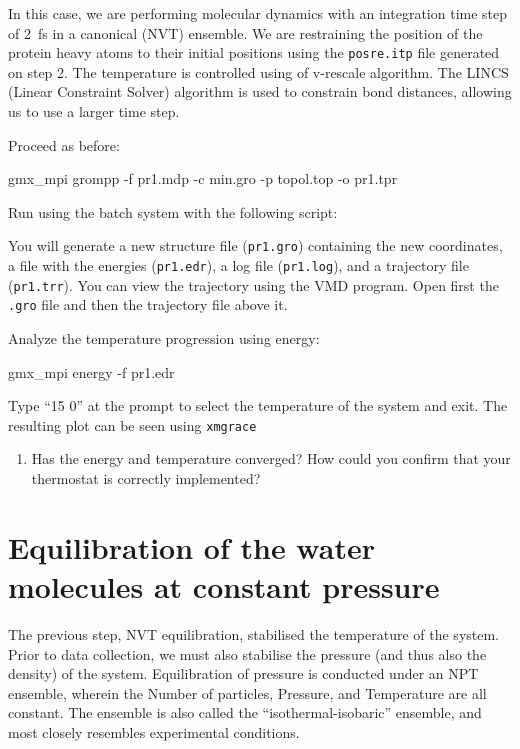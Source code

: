 \documentclass[10pt]{article}
\begin{document}
In this case, we are performing molecular dynamics with an integration time step of 2~fs in a canonical (NVT) ensemble. We are restraining the position of the protein heavy atoms to their initial positions using the \texttt{posre.itp} file generated on step 2. The temperature is controlled using of v-rescale algorithm. The LINCS (Linear Constraint Solver) algorithm is used to constrain bond distances, allowing us to use a larger time step. 

Proceed as before:

\begin{cmdline}
gmx_mpi grompp -f pr1.mdp -c min.gro -p topol.top -o pr1.tpr
\end{cmdline}

Run using the batch system with the following script:

You will generate a new structure file (\texttt{pr1.gro}) containing the new coordinates, a file with the energies (\texttt{pr1.edr}), a log file (\texttt{pr1.log}), and a trajectory file (\texttt{pr1.trr}). You can view the trajectory using the VMD program. Open first the \texttt{.gro} file and then the trajectory file above it. 

Analyze the temperature progression using energy:
\begin{cmdline}
gmx_mpi energy -f pr1.edr 
\end{cmdline}

Type ``15 0'' at the prompt to select the temperature of the system and exit. The resulting plot can be seen using \texttt{xmgrace}

\begin{summary}
    \begin{enumerate}[leftmargin=0.6cm]
        \renewcommand{\labelenumi}{Q\arabic{enumi}.}
        \setcounter{enumi}{7}
        \item Has the energy and temperature converged? How could you confirm that your thermostat is correctly implemented?
    \end{enumerate}
\end{summary}


\section{Equilibration of the water molecules at constant pressure}

The previous step, NVT equilibration, stabilised the temperature of the system. Prior to data collection, we must also stabilise the pressure (and thus also the density) of the system. Equilibration of pressure is conducted under an NPT ensemble, wherein the Number of particles, Pressure, and Temperature are all constant. The ensemble is also called the ``isothermal-isobaric'' ensemble, and most closely resembles experimental conditions.
\end{document}
